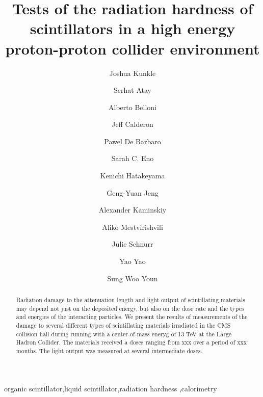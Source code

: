 \documentclass[review]{elsarticle}
\begin{document}
\begin{frontmatter}

\title{Tests of the radiation hardness of scintillators in a high energy proton-proton collider environment }


\author[umd]{Joshua Kunkle}
\author[istanbul]{Serhat Atay}
\author[umd]{Alberto Belloni}
\author[umd]{Jeff Calderon}
\author[rochester]{Pawel De Barbaro}
\author[umd]{Sarah C. Eno}
\author[baylor]{Kenichi Hatakeyama}
\author[umd]{Geng-Yuan Jeng}
\author[moscow]{Alexander Kaminskiy}
\author[rochester]{Aliko Mestvirishvili}
\author[umd]{Julie Schnurr}
\author[umd]{Yao Yao}
\author[korea]{Sung Woo Youn}


\address[umd]{Dept. Physics, U. Maryland, College Park MD 30742 USA}
\address[korea]{Institute for Basic Science, Center for Axion and Precision Physics Research, IBS Center for Axion and Precision Physics Research
Room 4315, Department of Physics, Natural Science Building (E6-2), KAIST,
291 Daehak-ro, Yuseong-gu, Daejeon 305-701, South Korea}
\address[fnal]{Fermi National Accelerator Laboratory, Batavia, IL, USA}
\address[baylor]{Baylor University, Waco, Texas, USA}
\address[iowa]{The University of Iowa, Iowa City, IA, USA}
\address[rochester]{The University of Rochester, Rochester, NY, USA}
\address[moscow]{Skobelsyn Institute of Nuclear Physics, Lomonosov Moscow, Russia}
\address[istanbul]{Istanbul Technical University, Istanbul, Turkey}

\begin{abstract}
  Radiation damage to the attenuation length and light output
  of scintillating materials may depend not just on the deposited energy, but also on the dose rate and the types and energies of the interacting particles.
  We present the
  results of measurements of the damage to several different types
  of scintillating materials irradiated in the CMS collision hall
  during running with a center-of-mass eneryg of 13 TeV at the Large Hadron Collider.  The materials received a doses ranging from {\color{red} xxx} over a period of {\color{red} xxx} months.  The light output was measured at several intermediate doses.
\end{abstract}

\begin{keyword}
organic scintillator\sep liquid scintillator\sep radiation
hardness \sep calorimetry
\end{keyword}

\end{frontmatter}
\end{document}
